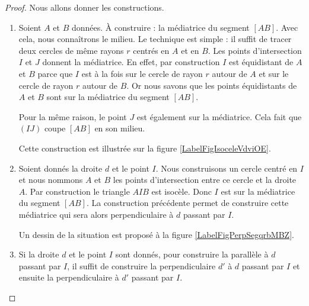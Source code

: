 \begin{proof}
    Nous allons donner les constructions.
    \begin{enumerate}
        \item
            Soient \( A\) et \( B\) données. À construire : la médiatrice du segment \( [AB]\). Avec cela, nous connaîtrons le milieu. Le technique est simple : il suffit de tracer deux cercles de même rayons \( r\) centrés en \( A\) et en \( B\). Les points d'intersection \( I\) et \( J\) donnent la médiatrice. En effet, par construction \( I\) est équidistant de \( A\) et \( B\) parce que \( I\) est à la fois sur le cercle de rayon \( r\) autour de \( A\) et sur le cercle de rayon \( r\) autour de \( B\). Or nous savons que les points équidistants de \( A\) et \( B\) sont sur la médiatrice du segment \( [AB]\).

            Pour la même raison, le point \( J\) est également sur la médiatrice. Cela fait que \( (IJ)\) coupe \( [AB]\) en son milieu.

Cette construction est illustrée sur la figure \ref{LabelFigIsoceleVdviOE}. %
\newcommand{\CaptionFigIsoceleVdviOE}{Le triangle \( AJB\) est isocèle.}


        \item

            Soient donnés la droite \( d\) et le point \( I\). Nous construisons un cercle centré en \( I\) et nous nommons \( A\) et $B$ les points d'intersection entre ce cercle et la droite \( A\). Par construction le triangle \( AIB\) est isocèle. Donc \( I\) est sur la médiatrice du segment \( [AB]\). La construction précédente permet de construire cette médiatrice qui sera alors perpendiculaire à \( d\) passant par \( I\).

Un dessin de la situation est proposé à la figure \ref{LabelFigPerpSegqrbMBZ}. %
\newcommand{\CaptionFigPerpSegqrbMBZ}{Le triangle \( AIB\) est isocèle et la droite rouge est la médiatrice de \( [AB]\).}


    \item
        
        Si la droite \( d\) et le point \( I\) sont donnés, pour construire la parallèle à \( d\) passant par \( I\), il suffit de construire la perpendiculaire \( d'\) à \( d\) passant par \( I\) et ensuite la perpendiculaire à \( d'\) passant par \( I\).

    \end{enumerate}
\end{proof}

